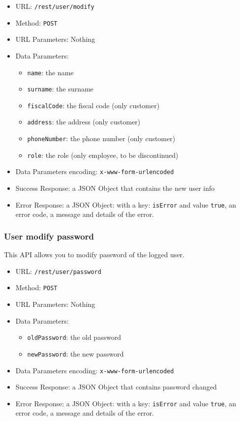 \begin{itemize}
    \item URL: \texttt{/rest/user/modify}
    \item Method: \texttt{POST}
    \item URL Parameters: Nothing
    \item Data Parameters:
    \begin{itemize}
        \item \texttt{name}: the name
        \item \texttt{surname}: the surname
        \item \texttt{fiscalCode}: the fiscal code (only customer)
        \item \texttt{address}: the address (only customer)
        \item \texttt{phoneNumber}: the phone number (only customer)
        \item \texttt{role}: the role (only employee, to be discontinued)
    \end{itemize}
    \item Data Parameters encoding: \texttt{x-www-form-urlencoded}
    \item Success Response: a JSON Object that contains the new user info
    \item Error Response: a JSON Object: with a key: \texttt{isError}  and value \texttt{true}, an error code, a message and details of the error.
\end{itemize}

\subsubsection*{User modify password}

This API allows you to modify password of the logged user.

\begin{itemize}
    \item URL: \texttt{/rest/user/password}
    \item Method: \texttt{POST}
    \item URL Parameters: Nothing
    \item Data Parameters:
    \begin{itemize}
        \item \texttt{oldPassword}: the old password
        \item \texttt{newPassword}: the new password
    \end{itemize}
    \item Data Parameters encoding: \texttt{x-www-form-urlencoded}
    \item Success Response: a JSON Object that contains password changed
    \item Error Response: a JSON Object: with a key: \texttt{isError}  and value \texttt{true}, an error code, a message and details of the error.
\end{itemize}